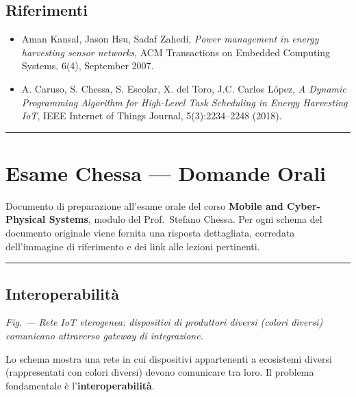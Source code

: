 \documentclass[
  italian,
  openany]{book}
\providecommand{\tightlist}{%
  \setlength{\itemsep}{0pt}\setlength{\parskip}{0pt}}
\begin{document}
\section{Riferimenti}\label{riferimenti}

\begin{itemize}
\tightlist
\item
  Aman Kansal, Jason Hsu, Sadaf Zahedi, \emph{Power management in energy
  harvesting sensor networks}, ACM Transactions on Embedded Computing
  Systems, 6(4), September 2007.
\item
  A. Caruso, S. Chessa, S. Escolar, X. del Toro, J.C. Carlos López,
  \emph{A Dynamic Programming Algorithm for High-Level Task Scheduling
  in Energy Harvesting IoT}, IEEE Internet of Things Journal,
  5(3):2234--2248 (2018).
\end{itemize}

\begin{center}\rule{0.5\linewidth}{0.5pt}\end{center}

\newpage

\appendix

\chapter{Esame Chessa --- Domande
Orali}\label{esame-chessa-domande-orali}

Documento di preparazione all'esame orale del corso \textbf{Mobile and
Cyber-Physical Systems}, modulo del Prof.~Stefano Chessa. Per ogni
schema del documento originale viene fornita una risposta dettagliata,
corredata dell'immagine di riferimento e dei link alle lezioni
pertinenti.

\begin{center}\rule{0.5\linewidth}{0.5pt}\end{center}

\section{Interoperabilità}\label{interoperabilituxe0-1}

\emph{Fig. --- Rete IoT eterogenea: dispositivi di produttori diversi
(colori diversi) comunicano attraverso gateway di integrazione.}

Lo schema mostra una rete in cui dispositivi appartenenti a ecosistemi
diversi (rappresentati con colori diversi) devono comunicare tra loro.
Il problema fondamentale è l'\textbf{interoperabilità}.
\end{document}
